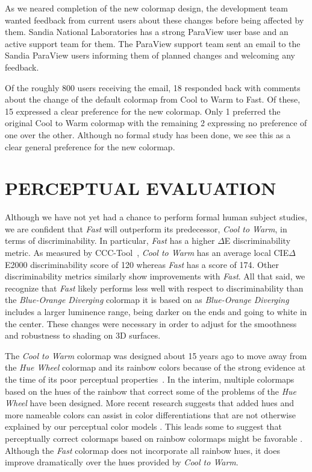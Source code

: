 \documentclass{IEEEcsmag}
\newcommand*{\colormap}[1]{\textsl{#1}\xspace}
\newcommand*{\huewheel}{\colormap{Hue Wheel}}
\newcommand*{\coolwarm}{\colormap{Cool to Warm}}
\newcommand*{\blueorange}{\colormap{Blue-Orange Diverging}}
\newcommand*{\fast}{\colormap{Fast}}
\begin{document}
As we neared completion of the new colormap design, the development team wanted feedback from current users about these changes before being affected by them.
Sandia National Laboratories has a strong ParaView user base and an active support team for them.
The ParaView support team sent an email to the Sandia ParaView users informing them of planned changes and welcoming any feedback.

Of the roughly 800 users receiving the email, 18 responded back with comments about the change of the default colormap from Cool to Warm to Fast.
Of these, 15 expressed a clear preference for the new colormap.
Only 1 preferred the original Cool to Warm colormap with the remaining 2 expressing no preference of one over the other.
Although no formal study has been done, we see this as a clear general preference for the new colormap.


\section{PERCEPTUAL EVALUATION}

Although we have not yet had a chance to perform formal human subject studies, we are confident that \fast will outperform its predecessor, \coolwarm, in terms of discriminability.
In particular, \fast has a higher $\Delta$E discriminability metric.
As measured by CCC-Tool~\cite{Nardini2021}, \coolwarm has an average local CIE$\Delta$E2000 discriminability score of 120 whereas \fast has a score of 174. Other discriminability metrics similarly show improvements with \fast.
All that said, we recognize that \fast%
likely performs less well with respect to discriminability than the \blueorange colormap it is based on as \blueorange includes a larger luminence range, being darker on the ends and going to white in the center.
These changes were necessary in order to adjust for the smoothness and robustness to shading on 3D surfaces.

The \coolwarm colormap was designed about 15 years ago to move away from the \huewheel colormap and its rainbow colors because of the strong evidence at the time of its poor perceptual properties~\cite{Rogowitz1998,Borland2007,Ware1988,Light2004}.
In the interim, multiple colormaps based on the hues of the rainbow that correct some of the problems of the \huewheel have been designed.
More recent research suggests that added hues and more nameable colors can assist in color differentiations that are not otherwise explained by our perceptual color models \cite{Reda2021}.
This leads some to suggest that perceptually correct colormaps based on rainbow colormaps might be favorable \cite{Ware2023}.
Although the \fast colormap does not incorporate all rainbow hues, it does improve dramatically over the hues provided by \coolwarm.
\end{document}

